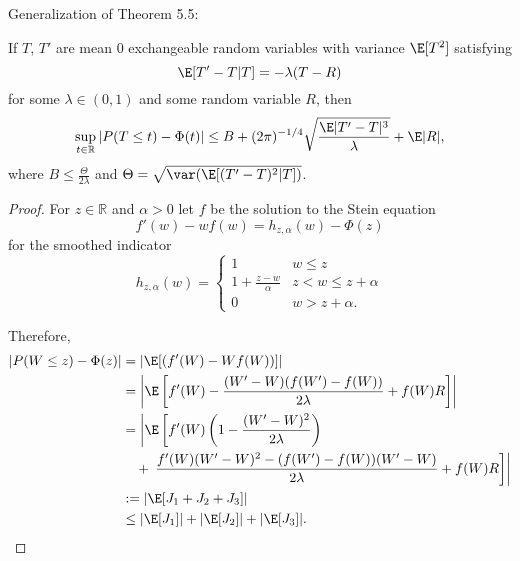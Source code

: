 Generalization of Theorem 5.5:
\begin{theorem}
  If $T$, $T'$ are mean 0 exchangeable random variables with variance $\E[T^2]$
  satisfying
  \begin{equation*}
    \label{eq:13}
    \E[T'-T|T] = -\lambda(T-R)    
  \end{equation*}
  for some $\lambda \in (0,1)$ and some random variable $R$, then 
  \begin{equation*}
    \label{eq:14}
    \sup_{t \in \mathbb{R}} |P(T \leq t) - \Phi(t)| \leq B +
    (2\pi)^{-1/4}\sqrt{\frac{\E|T'-T|^3}{\lambda}} + \E|R|,
  \end{equation*}
  where $B \leq \frac{\Theta}{2\lambda}$ and $\Theta =
  \sqrt{\var(\E[(T'-T)^2|T])}$. 
\end{theorem}
\begin{proof}
  For $z \in \mathbb{R}$ and $\alpha > 0$ let $f$ be the solution to the Stein equation 
  \begin{equation}
    f'(w) - wf(w) = h_{z,\alpha}(w) - \Phi(z)
  \end{equation}
  for the smoothed indicator
  \begin{equation}
    h_{z,\alpha}(w) =
    \begin{cases}
      1 & w \leq z \\
      1 + \frac{z-w}{\alpha} & z < w \leq z + \alpha \\
      0 & w > z + \alpha.
    \end{cases}
  \end{equation}

  Therefore,
  \begin{equation}
    \begin{split}
      |P(W \leq z) - \Phi(z)| &= |\E [(f'(W)-Wf(W))] | \\
      &= \left | \E \left [ 
          f'(W) - \frac{(W'-W)(f(W')-f(W))}{2\lambda} +f(W)R
        \right ]\right | \\
      &= \left | \E \left [f'(W)\left (1-\frac{(W'-W)^2}{2\lambda}\right) \right . \right . \\
      &\quad + \left . \left . 
          \frac{f'(W)(W'-W)^2-(f(W')-f(W))(W'-W)}{2\lambda} + f(W)R
        \right ] \right | \\
      &:= | \E [J_1 + J_2 + J_3] | \\
      &\leq |\E [J_1]| + |\E [J_2]| + |\E [J_3]|.
    \end{split}
  \end{equation}


\end{proof}
